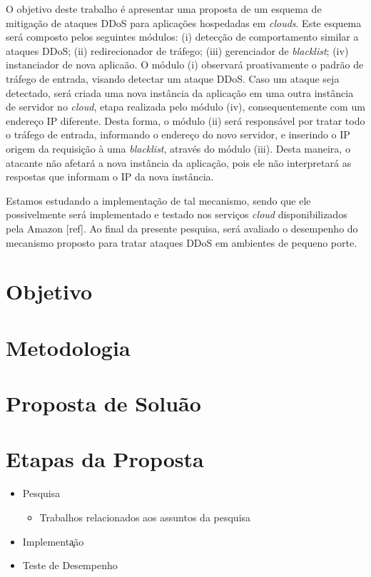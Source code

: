 \documentclass[a4paper, 11pt]{article}
\begin{document}
O objetivo deste trabalho é apresentar uma proposta de um esquema de mitigação
de ataques DDoS para aplicações hospedadas em \emph{clouds}. Este esquema será
composto pelos seguintes módulos: (i) detecção de comportamento similar a
ataques DDoS; (ii) redirecionador de tráfego; (iii) gerenciador de
\emph{blacklist}; (iv) instanciador de nova aplica\cc\~ao. O módulo (i)
observará proativamente o padrão de tráfego de entrada, visando detectar um
ataque DDoS. Caso um ataque seja detectado, será criada uma nova instância da
aplicação em uma outra instância de servidor no \emph{cloud}, etapa realizada
pelo m\'odulo (iv), consequentemente com um endereço IP diferente. Desta forma,
o módulo (ii) será responsável por tratar todo o tráfego de entrada, informando
o endereço do novo servidor, e inserindo o IP origem da requisição à uma
\emph{blacklist}, através do módulo (iii). Desta maneira, o atacante não afetará
a nova instância da aplicação, pois ele não interpretará as respostas que
informam o IP da nova instância. 

Estamos estudando a implementação de tal mecanismo, sendo que ele possivelmente
será implementado e testado nos serviços \emph{cloud} disponibilizados pela
Amazon [ref]. Ao final da presente pesquisa, ser\'a avaliado o
desempenho do mecanismo proposto para tratar ataques DDoS em ambientes de
pequeno porte.

\section{Objetivo}

\section{Metodologia}

\section{Proposta de Solu\cc\~ao}

\section{Etapas da Proposta}
\begin{itemize}
 \item Pesquisa
  \begin{itemize}
  \item Trabalhos relacionados aos assuntos da pesquisa
  \end{itemize}
 \item Implementa\c\cc\~ao
  \begin{itemize}
  \end{itemize}
 \item Teste de Desempenho 
  \begin{itemize}
  \end{itemize}
\end{itemize}


\newpage


\end{document}

